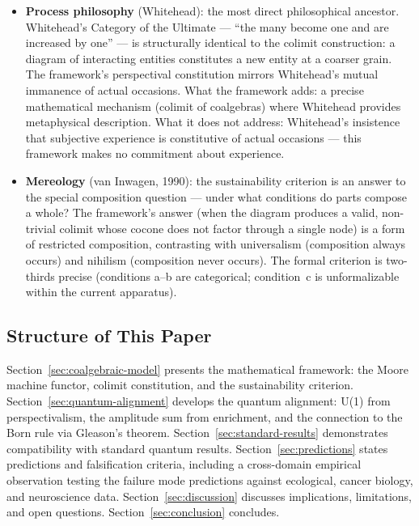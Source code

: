 \documentclass[12pt,a4paper]{article}
\begin{document}
\begin{itemize}
  \item \textbf{Process philosophy} (Whitehead): the most direct philosophical ancestor. Whitehead's Category of the Ultimate --- ``the many become one and are increased by one'' --- is structurally identical to the colimit construction: a diagram of interacting entities constitutes a new entity at a coarser grain. The framework's perspectival constitution mirrors Whitehead's mutual immanence of actual occasions. What the framework adds: a precise mathematical mechanism (colimit of coalgebras) where Whitehead provides metaphysical description. What it does not address: Whitehead's insistence that subjective experience is constitutive of actual occasions --- this framework makes no commitment about experience.

  \item \textbf{Mereology} (van Inwagen, 1990): the sustainability criterion is an answer to the special composition question --- under what conditions do parts compose a whole? The framework's answer (when the diagram produces a valid, non-trivial colimit whose cocone does not factor through a single node) is a form of restricted composition, contrasting with universalism (composition always occurs) and nihilism (composition never occurs). The formal criterion is two-thirds precise (conditions a--b are categorical; condition~c is unformalizable within the current apparatus).
\end{itemize}

\subsection{Structure of This Paper}
\label{sec:structure}

Section~\ref{sec:coalgebraic-model} presents the mathematical framework: the Moore machine functor, colimit constitution, and the sustainability criterion. Section~\ref{sec:quantum-alignment} develops the quantum alignment: U(1) from perspectivalism, the amplitude sum from enrichment, and the connection to the Born rule via Gleason's theorem. Section~\ref{sec:standard-results} demonstrates compatibility with standard quantum results. Section~\ref{sec:predictions} states predictions and falsification criteria, including a cross-domain empirical observation testing the failure mode predictions against ecological, cancer biology, and neuroscience data. Section~\ref{sec:discussion} discusses implications, limitations, and open questions. Section~\ref{sec:conclusion} concludes.
\end{document}
